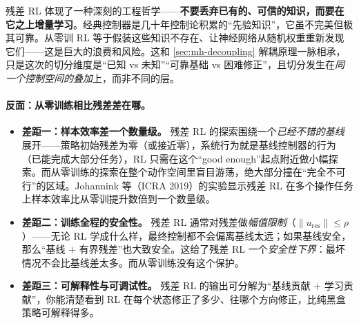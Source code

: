 \begin{insight}
残差 RL 体现了一种深刻的工程哲学——\textbf{不要丢弃已有的、可信的知识，而要在它之上增量学习}。经典控制器是几十年控制论积累的“先验知识”，它虽不完美但极其可靠。从零训 RL 等于假装这些知识不存在、让神经网络从随机权重重新发现它们——这是巨大的浪费和风险。这和 \cref{sec:mh-decoupling} 解耦原理一脉相承，只是这次的切分维度是“已知 vs 未知”“可靠基础 vs 困难修正”，且切分发生在\emph{同一个控制空间的叠加}上，而非不同的层。
\end{insight}

\paragraph{反面：从零训练相比残差差在哪。}
\begin{itemize}
  \item \textbf{差距一：样本效率差一个数量级。} 残差 RL 的探索围绕一个\emph{已经不错的基线}展开——策略初始残差为零（或接近零），系统行为就是基线控制器的行为（已能完成大部分任务），RL 只需在这个“good enough”起点附近做小幅探索。而从零训练的探索在整个动作空间里盲目游荡，绝大部分撞在“完全不可行”的区域。Johannink 等\cite{johannink2019residual}（ICRA 2019）的实验显示残差 RL 在多个操作任务上样本效率比从零训提升数倍到一个数量级。
  \item \textbf{差距二：训练全程的安全性。} 残差 RL 通常对残差做\emph{幅值限制}（$\|u_{\text{res}}\|\le\rho$）——无论 RL 学成什么样，最终控制都不会偏离基线太远；如果基线安全，那么“基线 $+$ 有界残差”也大致安全。这给了残差 RL 一个\emph{安全性下界}：最坏情况不会比基线差太多。而从零训练没有这个保护。
  \item \textbf{差距三：可解释性与可调试性。} 残差 RL 的输出可分解为“基线贡献 $+$ 学习贡献”，你能清楚看到 RL 在每个状态修正了多少、往哪个方向修正，比纯黑盒策略可解释得多。
\end{itemize}

